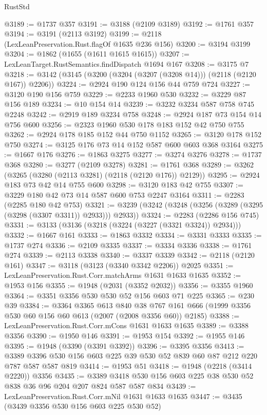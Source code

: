 \begin{lexlean}{RustStd}
\begin{coremodule}
{\begin{coremodule}
{{{{{{{{{{{{{{{{@3189 := @1737 @357
@3191 := @3188 (@2109 @3189)
@3192 := @1761 @357
@3194 := @3191 (@2113 @3192)
@3199 := @2118 (LexLeanPreservation.Rust.flagOf @1635 @236 @156)
@3200 := @3194 @3199
@3204 := @1862 (@1655 (@1611 @1615 @1615))
@3207 := LexLeanTarget.RustSemantics.findDispatch @1694 @167
@3208 := @3175 @7
@3218 := @3142 (@3145 (@3200 (@3204 (@3207 (@3208 @14))) (@2118 (@2120 @167)) @2206))
@3224 := @2924 @190 @124 @156 @44 @759 @724
@3227 := @3120 @190 @156 @759
@3229 := @2233 @1960 @530
@3232 := @3229 @87 @156 @189
@3234 := @10 @154 @14
@3239 := @3232 @3234 @587 @758 @745 @2248
@3242 := @2919 @189 @3234 @758
@3248 := @2924 @187 @73 @154 @14 @756 @600
@3256 := @2323 @1960 @530 @178 @183 @152 @42 @750 @755
@3262 := @2924 @178 @185 @152 @44 @750 @1152
@3265 := @3120 @178 @152 @750
@3274 := @3125 @176 @73 @14 @152 @587 @600 @603 @368 @3164
@3275 := @1667 @176
@3276 := @1863 @3275
@3277 := @3274 @3276
@3278 := @1737 @368
@3280 := @3277 (@2109 @3278)
@3281 := @1761 @368
@3289 := @3262 (@3265 (@3280 (@2113 @3281) (@2118 (@2120 @176)) @2129))
@3295 := @2924 @183 @73 @42 @14 @755 @600
@3298 := @3120 @183 @42 @755
@3307 := @3229 @180 @42 @73 @14 @587 @600 @753 @2247 @3164
@3311 := @2283 (@2285 @180 @42 @753)
@3321 := @3239 (@3242 (@3248 (@3256 (@3289 (@3295 (@3298 (@3307 @3311)) @2933))) @2933))
@3324 := @2283 (@2286 @156 @745)
@3331 := @3133 (@3136 (@3218 (@3224 (@3227 (@3321 @3324)) @2934)))
@3332 := @1667 @161
@3333 := @1863 @3332
@3334 := @3331 @3333
@3335 := @1737 @274
@3336 := @2109 @3335
@3337 := @3334 @3336
@3338 := @1761 @274
@3339 := @2113 @3338
@3340 := @3337 @3339
@3342 := @2118 (@2120 @161)
@3347 := @3118 (@3123 (@3340 @3342 @2206)) @2025
@3351 := LexLeanPreservation.Rust.Corr.matchArms @1631 @1633 @1635
@3352 := @1953 @156
@3355 := @1948 (@2031 (@3352 @2032))
@3356 := @3355 @1960
@3364 := @3351 @3356 @530 @530 @52 @156 @603 @71 @225
@3365 := @230 @39
@3384 := @3364
    @3365
    @613
    @840
    @38
    @767
    @161
    @666
    (@1999 @3356 @530 @60 @156 @60 @613 (@2007 (@2008 @3356 @60)) @2185)
@3388 := LexLeanPreservation.Rust.Corr.mCons @1631 @1633 @1635
@3389 := @3388 @3356
@3390 := @1950 @146
@3391 := @1953 @154
@3392 := @1955 @146
@3395 := @1948 (@3390 (@3391 @3392))
@3396 := @3395 @3356
@3413 := @3389 @3396 @530 @156 @603 @225 @39 @530 @52 @839 @60 @87 @212 @220 @787 @587 @587 @819
@3414 := @1953 @51
@3418 := @1948 (@2218 (@3414 @2220)) @3356
@3435 := @3389 @3418 @530 @156 @603 @225 @38 @530 @52 @838 @36 @96 @204 @207 @824 @587 @587 @834
@3439 := LexLeanPreservation.Rust.Corr.mNil @1631 @1633 @1635
@3447 := @3435 (@3439 @3356 @530 @156 @603 @225 @530 @52)
}}}}}}}}}}}}}}}}
\end{coremodule}}
\end{coremodule}
\end{lexlean}
